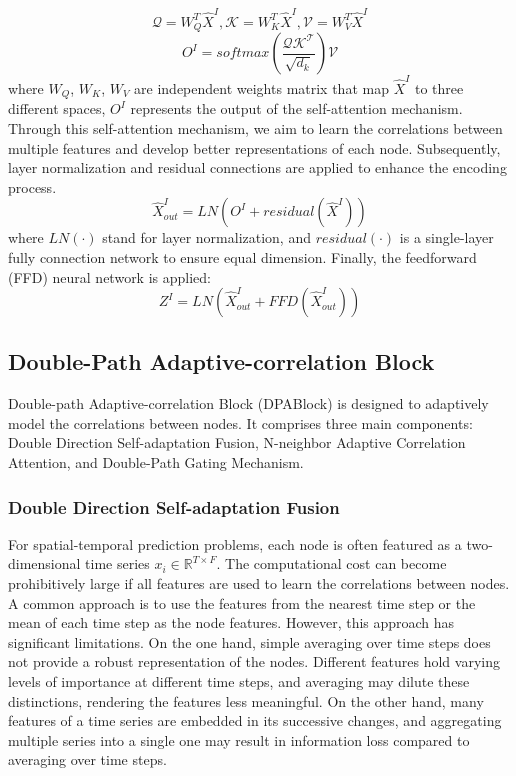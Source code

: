 \begin{equation}
     \mathcal{Q}= {W_Q^T} {\hat{X}^{I}}, \mathcal{K}= {W_K^T} {\hat{X}^{I}}, \mathcal{V}= {W_V^T} {\hat{X}^{I}}
\end{equation}
\begin{equation}
    {O^{I}}=softmax(\frac{ \mathcal{Q} \mathcal{K^T}}{\sqrt{d_k}}) \mathcal{V}
\end{equation}
where  $ {W_Q}$, $ {W_K}$, $ {W_V}$ are independent weights matrix that map $ {\hat{X}^{I}}$ to three different spaces, $O^{I}$ represents the output of the self-attention mechanism. Through this self-attention mechanism, we aim to learn the correlations between multiple features and develop better representations of each node. Subsequently, layer normalization and residual connections are applied to enhance the encoding process.
\begin{equation}
    \hat{X}^{I}_{out}=LN( O^{I}+residual(\hat{X}^{I}))
\end{equation}
where $LN(\cdot)$ stand for layer normalization, and $residual(\cdot)$ is a single-layer fully connection network to ensure equal dimension. Finally, the feedforward (FFD) neural network is applied:
\begin{equation}
    Z^{I}=LN( \hat{X}^{I}_{out}+FFD(\hat{X}^{I}_{out}))
\end{equation}

\subsection{Double-Path Adaptive-correlation Block}
Double-path Adaptive-correlation Block (DPABlock) is designed to adaptively model the correlations between nodes. It comprises three main components: Double Direction Self-adaptation Fusion, N-neighbor Adaptive Correlation Attention, and Double-Path Gating Mechanism.

\subsubsection{Double Direction Self-adaptation Fusion}
For spatial-temporal prediction problems, each node is often featured as a two-dimensional time series $x_i \in \mathbb{R}^{T\times F}$. The computational cost can become prohibitively large if all features are used to learn the correlations between nodes. A common approach is to use the features from the nearest time step or the mean of each time step as the node features. However, this approach has significant limitations. On the one hand, simple averaging over time steps does not provide a robust representation of the nodes. Different features hold varying levels of importance at different time steps, and averaging may dilute these distinctions, rendering the features less meaningful. On the other hand, many features of a time series are embedded in its successive changes, and aggregating multiple series into a single one may result in information loss compared to averaging over time steps.

